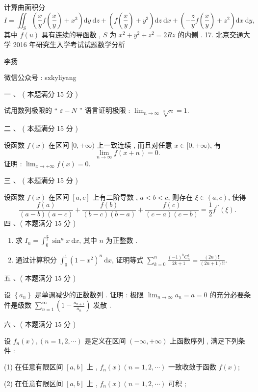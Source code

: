 \documentclass[10pt]{article}
\begin{document}
{ 计算曲面积分 
$$
I=\iint_{S}\left(\frac{x}{y} f\left(\frac{x}{y}\right)+x^{3}\right) \mathrm{d} y \mathrm{~d} z+\left(f\left(\frac{x}{y}\right)+y^{3}\right) \mathrm{d} z \mathrm{~d} x+\left(-\frac{z}{y} f\left(\frac{x}{y}\right)+z^{2}\right) \mathrm{d} x \mathrm{~d} y,
$$
 其中  $f(u)$  具有连续的导函数 , $S$  为  $x^{2}+y^{2}+z^{2}=2 R z$  的内侧 . 17.  北京交通大学  2016  年研究生入学考试试题数学分析 

 李扬 

 微信公众号 : sxkyliyang

 一 、 ( 本题满分  15  分 )

 试用数列极限的  “ $\varepsilon-N$ ”  语言证明极限 : $\lim _{n \rightarrow \infty} \sqrt[n]{n}=1$.

 二 、 ( 本题满分  15  分 )

 设函数  $f(x)$  在区间  $[0,+\infty)$  上一致连续 ,  而且对任意  $x \in[0,+\infty)$,  有 
$$
\lim _{n \rightarrow \infty} f(x+n)=0 .
$$
 证明 : $\lim _{x \rightarrow+\infty} f(x)=0$.

 三 、 ( 本题满分  15  分 )

 设函数  $f(x)$  在区间  $[a, c]$  上有二阶导数 , $a<b<c$,  则存在  $\xi \in(a, c)$,  使得 
$$
\frac{f(a)}{(a-b)(a-c)}+\frac{f(b)}{(b-c)(b-a)}+\frac{f(c)}{(c-a)(c-b)}=\frac{1}{2} f^{\prime \prime}(\xi) .
$$
 四 、( 本题满分  15  分 )

\begin{enumerate}
  \item  求  $I_{n}=\int_{0}^{\frac{\pi}{2}} \sin ^{n} x \mathrm{~d} x$,  其中  $n$  为正整数 .

  \item  通过计算积分  $\int_{0}^{1}\left(1-x^{2}\right)^{n} \mathrm{~d} x$,  证明等式  $\sum_{k=0}^{n} \frac{(-1)^{k} C_{n}^{k}}{2 k+1}=\frac{(2 n) ! !}{(2 n+1) ! !}$.

\end{enumerate}
 五 、( 本题满分  15  分 )

 设  $\left\{a_{n}\right\}$  是单调减少的正数数列 .  证明 :  极限  $\lim _{n \rightarrow \infty} a_{n}=a=0$  的充分必要条件是级数  $\sum_{n=1}^{\infty}\left(1-\frac{a_{n+1}}{a_{n}}\right)$  发散 .

 六 、( 本题满分  15  分 )

 设  $f_{n}(x),(n=1,2, \cdots)$  是定义在区间  $(-\infty,+\infty)$  上函数序列 ,  满足下列条件 :

(1)  在任意有限区间  $[a, b]$  上 , $f_{n}(x)(n=1,2, \cdots)$  一致收敛于函数  $f(x)$;

(2)  在任意有限区间  $[a, b]$  上 , $f_{n}(x)(n=1,2, \cdots)$  可积 ;

}
\end{document}
